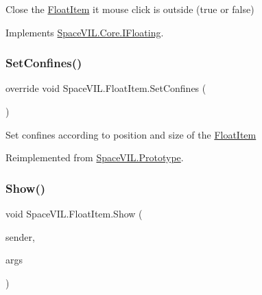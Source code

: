 Close the \mbox{\hyperlink{class_space_v_i_l_1_1_float_item}{Float\+Item}} it mouse click is outside (true or false) 



Implements \mbox{\hyperlink{interface_space_v_i_l_1_1_core_1_1_i_floating}{Space\+V\+I\+L.\+Core.\+I\+Floating}}.

\mbox{\label{class_space_v_i_l_1_1_float_item_ada12a95045db04f1a5e196a14f1a8d0f}} 
\subsubsection{\texorpdfstring{Set\+Confines()}{SetConfines()}}
{\footnotesize\ttfamily override void Space\+V\+I\+L.\+Float\+Item.\+Set\+Confines (\begin{DoxyParamCaption}{ }\end{DoxyParamCaption})\hspace{0.3cm}{\ttfamily [virtual]}}



Set confines according to position and size of the \mbox{\hyperlink{class_space_v_i_l_1_1_float_item}{Float\+Item}} 



Reimplemented from \mbox{\hyperlink{class_space_v_i_l_1_1_prototype_af063fd80d51a3c42c8f43e0e97b6b809}{Space\+V\+I\+L.\+Prototype}}.

\mbox{\label{class_space_v_i_l_1_1_float_item_a7b352daad024029b2816939c0736aa66}} 
\subsubsection{\texorpdfstring{Show()}{Show()}}
{\footnotesize\ttfamily void Space\+V\+I\+L.\+Float\+Item.\+Show (\begin{DoxyParamCaption}\item[{\mbox{\hyperlink{interface_space_v_i_l_1_1_core_1_1_i_item}{I\+Item}}}]{sender,  }\item[{\mbox{\hyperlink{class_space_v_i_l_1_1_core_1_1_mouse_args}{Mouse\+Args}}}]{args }\end{DoxyParamCaption})}



